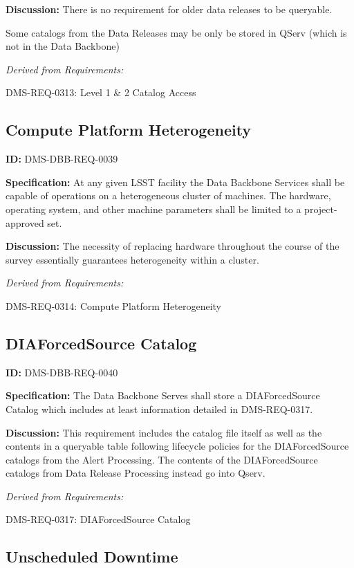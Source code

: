 \documentclass[SE,toc]{lsstdoc}
\begin{document}
\textbf{Discussion:}
There is no requirement for older data releases to be queryable.

Some catalogs from the Data Releases may be only be stored in QServ (which is not in the Data Backbone)

\emph{Derived from Requirements:}

DMS-REQ-0313:
Level 1 \& 2 Catalog Access \newline

\subsection{Compute Platform Heterogeneity}

\label{DMS-DBB-REQ-0039}
\textbf{ID:} DMS-DBB-REQ-0039

\textbf{Specification:}
At any given LSST facility the Data Backbone Services shall be capable of operations on a heterogeneous cluster of machines. The hardware, operating system, and other machine parameters shall be limited to a project-approved set.

\textbf{Discussion:}
The necessity of replacing hardware throughout the course of the survey essentially guarantees heterogeneity within a cluster.

\emph{Derived from Requirements:}

DMS-REQ-0314:
Compute Platform Heterogeneity \newline

\subsection{DIAForcedSource Catalog}

\label{DMS-DBB-REQ-0040}
\textbf{ID:} DMS-DBB-REQ-0040

\textbf{Specification:}
The Data Backbone Serves shall store a DIAForcedSource Catalog which includes at least information detailed in DMS-REQ-0317.

\textbf{Discussion:}
This requirement includes the catalog file itself as well as the contents in a queryable table following lifecycle policies for the DIAForcedSource catalogs from the Alert Processing.  The contents of the DIAForcedSource catalogs from Data Release Processing instead go into Qserv.

\emph{Derived from Requirements:}

DMS-REQ-0317:
DIAForcedSource Catalog \newline

\subsection{Unscheduled Downtime}
\end{document}
